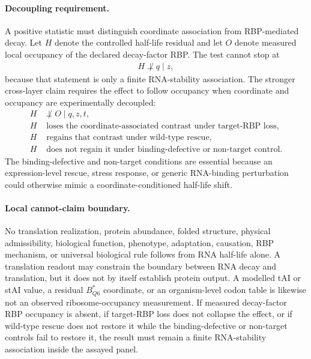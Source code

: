 \paragraph{Decoupling requirement.}
A positive statistic must distinguish coordinate association from RBP-mediated decay.  Let $H$ denote the controlled half-life residual and let $O$ denote measured local occupancy of the declared decay-factor RBP.  The test cannot stop at
$$
\begin{aligned}
  H \not\perp q \mid z,
\end{aligned}
$$
because that statement is only a finite RNA-stability association.  The stronger cross-layer claim requires the effect to follow occupancy when coordinate and occupancy are experimentally decoupled:
$$
\begin{aligned}
  H &\not\perp O \mid q,z,t, \\
  H &\text{ loses the coordinate-associated contrast under target-RBP loss}, \\
  H &\text{ regains that contrast under wild-type rescue}, \\
  H &\text{ does not regain it under binding-defective or non-target control.}
\end{aligned}
$$
The binding-defective and non-target conditions are essential because an expression-level rescue, stress response, or generic RNA-binding perturbation could otherwise mimic a coordinate-conditioned half-life shift.

\paragraph{Local cannot-claim boundary.}
No translation realization, protein abundance, folded structure, physical admissibility, biological function, phenotype, adaptation, causation, RBP mechanism, or universal biological rule follows from RNA half-life alone.  A translation readout may constrain the boundary between RNA decay and translation, but it does not by itself establish protein output.  A modelled tAI or stAI value, a residual $B^{\ast}_{Q6}$ coordinate, or an organism-level codon table is likewise not an observed ribosome-occupancy measurement.  If measured decay-factor RBP occupancy is absent, if target-RBP loss does not collapse the effect, or if wild-type rescue does not restore it while the binding-defective or non-target controls fail to restore it, the result must remain a finite RNA-stability association inside the assayed panel.

